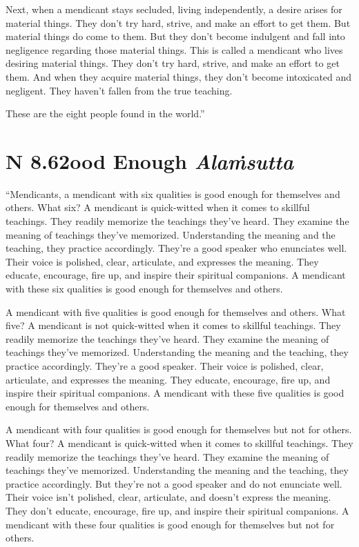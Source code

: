 \documentclass[12pt,openany]{book}%
\newcommand*{\suttatitleacronym}[1]{\smaller[2]{#1}\vspace*{.3em}}
\newcommand*{\suttatitletranslation}[1]{\linebreak{#1}}
\newcommand*{\suttatitleroot}[1]{\linebreak\smaller[2]\itshape{#1}}
\newcommand*{\tocacronym}[1]{\hspace*{-3.3em}{#1}\quad}
\newcommand*{\toctranslation}[1]{#1}
\newcommand*{\tocroot}[1]{(\textit{#1})}
\begin{document}
Next, when a mendicant stays secluded, living independently, a desire arises for material things. They don’t try hard, strive, and make an effort to get them. But material things do come to them. But they don’t become indulgent and fall into negligence regarding those material things. This is called a mendicant who lives desiring material things. They don’t try hard, strive, and make an effort to get them. And when they acquire material things, they don’t become intoxicated and negligent. They haven’t fallen from the true teaching. 

These are the eight people found in the world.” 

%
\section*{{\suttatitleacronym AN 8.62}{\suttatitletranslation Good Enough }{\suttatitleroot Alaṁsutta}}
\addcontentsline{toc}{section}{\tocacronym{AN 8.62} \toctranslation{Good Enough } \tocroot{Alaṁsutta}}

“Mendicants, a mendicant with six qualities is good enough for themselves and others. What six? A mendicant is quick-witted when it comes to skillful teachings. They readily memorize the teachings they’ve heard. They examine the meaning of teachings they’ve memorized. Understanding the meaning and the teaching, they practice accordingly. They’re a good speaker who enunciates well. Their voice is polished, clear, articulate, and expresses the meaning. They educate, encourage, fire up, and inspire their spiritual companions. A mendicant with these six qualities is good enough for themselves and others. 

A mendicant with five qualities is good enough for themselves and others. What five? A mendicant is not quick-witted when it comes to skillful teachings. They readily memorize the teachings they’ve heard. They examine the meaning of teachings they’ve memorized. Understanding the meaning and the teaching, they practice accordingly. They’re a good speaker. Their voice is polished, clear, articulate, and expresses the meaning. They educate, encourage, fire up, and inspire their spiritual companions. A mendicant with these five qualities is good enough for themselves and others. 

A mendicant with four qualities is good enough for themselves but not for others. What four? A mendicant is quick-witted when it comes to skillful teachings. They readily memorize the teachings they’ve heard. They examine the meaning of teachings they’ve memorized. Understanding the meaning and the teaching, they practice accordingly. But they’re not a good speaker and do not enunciate well. Their voice isn’t polished, clear, articulate, and doesn’t express the meaning. They don’t educate, encourage, fire up, and inspire their spiritual companions. A mendicant with these four qualities is good enough for themselves but not for others. 
\end{document}
